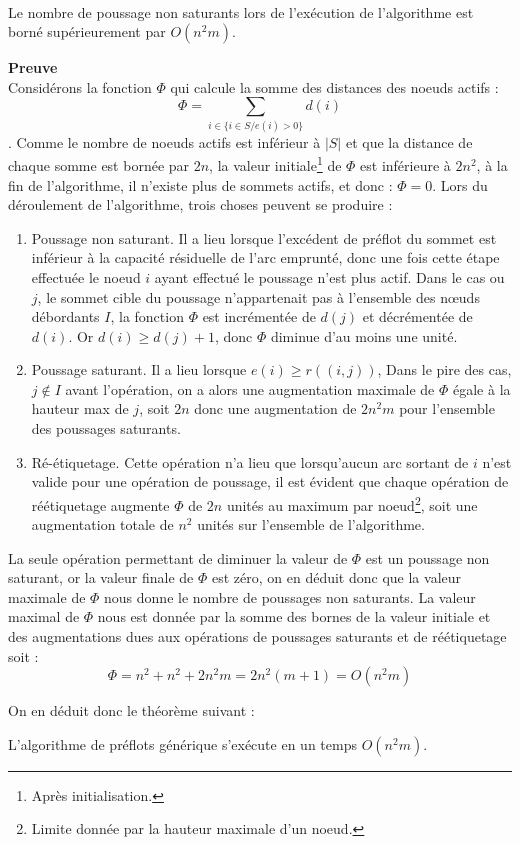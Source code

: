 \begin{lemma}~\\
	\label{borne_pns}
	Le nombre de poussage non saturants lors de l'exécution de l'algorithme est borné supérieurement
	par $O(n^2m)$.
\end{lemma}

\textbf{Preuve}\\
Considérons la fonction $\Phi$ qui calcule la somme des distances des noeuds actifs : $$
\Phi = \sum_{i \in \{i \in S / e(i) > 0\}} d(i)$$. Comme le nombre de noeuds actifs est inférieur à
$|S|$ et que la distance de chaque somme est bornée par $2n$, la valeur initiale\footnote{Après
initialisation.} de $\Phi$ est inférieure à $2n^2$, à la fin de l'algorithme, il n'existe plus de
sommets actifs, et donc : $\Phi = 0$.
Lors du déroulement de l'algorithme, trois choses peuvent se produire : \begin{enumerate}
	\item Poussage non saturant. Il a lieu lorsque l'excédent de préflot du sommet est inférieur à la
		capacité résiduelle de l'arc emprunté, donc une fois cette étape effectuée le noeud $i$ ayant
		effectué le poussage n'est plus actif. Dans le cas ou $j$, le sommet cible du poussage
		n'appartenait pas à l'ensemble des n\oe uds débordants $I$, la fonction $\Phi$ est incrémentée de 
		$d(j)$ et décrémentée de $d(i)$.  Or $d(i) \geq d(j) + 1$, donc $\Phi$ diminue d'au moins une
		unité.
	\item Poussage saturant. Il a lieu lorsque $e(i) \geq r((i,j))$, Dans le pire des cas, $j \not
		\in I$ avant l'opération, on a alors une augmentation maximale de $\Phi$ égale à la hauteur max
		de $j$, soit $2n$ donc une augmentation de $2n^2m$ pour l'ensemble des poussages saturants.
	\item Ré-étiquetage. Cette opération n'a lieu que lorsqu'aucun arc sortant de $i$ n'est valide
		pour une opération de poussage, il est évident que chaque opération de réétiquetage augmente
		$\Phi$ de $2n$ unités au maximum par noeud\footnote{Limite donnée par la hauteur maximale d'un
		noeud.}, soit une augmentation totale de $n^2$ unités sur l'ensemble de l'algorithme.
\end{enumerate}

La seule opération permettant de diminuer la valeur de $\Phi$ est un poussage non saturant, or la
valeur finale de $\Phi$ est zéro, on en déduit donc que la valeur maximale de $\Phi$ nous donne le
nombre de poussages non saturants. La valeur maximal de $\Phi$ nous est donnée par la somme des
bornes de la valeur initiale et des augmentations dues aux opérations de poussages saturants et de
réétiquetage soit : $$
\Phi = n^2 + n^2 + 2n^2m = 2n^2 (m + 1) = O(n^2m) $$

On en déduit donc le théorème suivant :
\begin{thrm}
	L'algorithme de préflots générique s'exécute en un temps $O(n^2m)$.
\end{thrm}


